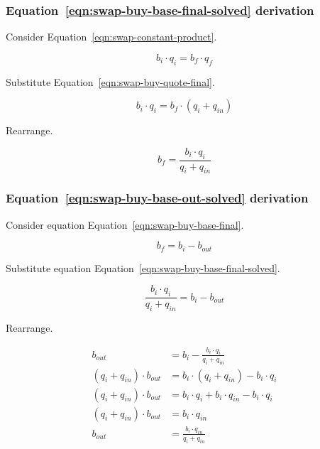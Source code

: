 \documentclass[table, twocolumn]{article}
\begin{document}
\subsubsection{Equation~\ref{eqn:swap-buy-base-final-solved} derivation}%
\label{sssec:equation-eqn-swap-buy-base-final-solved-derivation}

Consider Equation~\ref{eqn:swap-constant-product}.

\begin{equation}
	b_i \cdot q_i = b_f \cdot q_f \nonumber
\end{equation}

Substitute Equation~\ref{eqn:swap-buy-quote-final}.

\begin{equation}
	b_i \cdot q_i = b_f \cdot (q_i + q_{in}) \nonumber
\end{equation}

Rearrange.

\begin{equation}
	b_f = \frac{b_i \cdot q_i}{q_i + q_{in}} \nonumber
\end{equation}

\subsubsection{Equation~\ref{eqn:swap-buy-base-out-solved} derivation}%
\label{sssec:equation-eqn-swap-buy-base-out-solved-derivation}

Consider equation Equation~\ref{eqn:swap-buy-base-final}.

\begin{equation}
	b_f = b_i - b_{out} \nonumber
\end{equation}

Substitute equation Equation~\ref{eqn:swap-buy-base-final-solved}.

\begin{equation}
	\frac{b_i \cdot q_i}{q_i + q_{in}} = b_i - b_{out} \nonumber
\end{equation}

Rearrange.

\begin{align}
	b_{out}                      & = b_i - \frac{b_i \cdot q_i}{q_i + q_{in}} \nonumber \\
	(q_i + q_{in}) \cdot b_{out} & = b_i \cdot (q_i + q_{in})- b_i \cdot q_i \nonumber  \\
	(q_i + q_{in}) \cdot b_{out} & =
	b_i \cdot q_i + b_i \cdot q_{in} - b_i \cdot q_i \nonumber                          \\
	(q_i + q_{in}) \cdot b_{out} & = b_i \cdot q_{in} \nonumber                         \\
	b_{out}                      & = \frac{b_i \cdot q_{in}}{q_i + q_{in}} \nonumber
\end{align}
\end{document}
